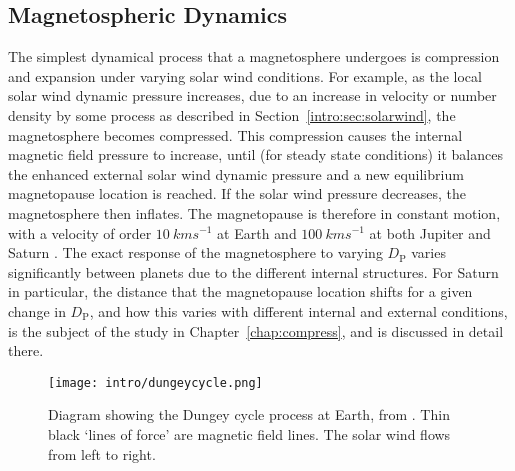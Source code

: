 \subsection{Magnetospheric Dynamics}\label{intro:sec:dynamics}
The simplest dynamical process that a magnetosphere undergoes is compression and expansion under varying solar wind conditions. For example, as the local solar wind dynamic pressure increases, due to an increase in velocity or number density by some process as described in Section~\ref{intro:sec:solarwind}, the magnetosphere becomes compressed. This compression causes the internal magnetic field pressure to increase, until (for steady state conditions) it balances the enhanced external solar wind dynamic pressure and a new equilibrium magnetopause location is reached. If the solar wind pressure decreases, the magnetosphere then inflates. The magnetopause is therefore in constant motion, with a velocity of order $\SI{10}{kms^{-1}}$ at Earth \citep{berchem1982} and $\SI{100}{kms^{-1}}$ at both Jupiter \citep{bame1992} and Saturn \citep{masters2011}. The exact response of the magnetosphere to varying $D_\mathrm{P}$ varies significantly between planets due to the different internal structures. For Saturn in particular, the distance that the magnetopause location shifts for a given change in $D_\mathrm{P}$, and how this varies with different internal and external conditions, is the subject of the study in Chapter~\ref{chap:compress}, and is discussed in detail there.

\begin{figure}
\centering
\noindent\texttt{[image: intro/dungeycycle.png]}
\caption[Diagram of the Dungey cycle.]{Diagram showing the Dungey cycle process at Earth, from \citet{dungey1961}. Thin black `lines of force' are magnetic field lines. The solar wind flows from left to right.}
\label{intro:fig:dungeycycle}
\end{figure}


